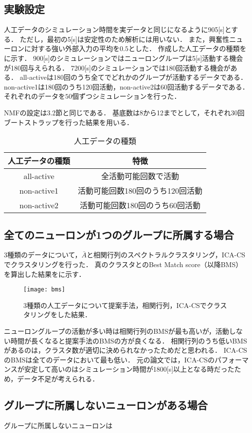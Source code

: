 \subsection{実験設定}
人工データのシミュレーション時間を実データと同じになるように905[s]とする．
ただし，最初の5[s]は安定性のため解析には用いない．
また，興奮性ニューロンに対する強い外部入力の平均を$0.5$とした．
作成した人工データの種類をに示す．
900[s]のシミュレーションではニューロングループは5[s]活動する機会が180回与えられる．
7200[s]のシミュレーションでは180回活動する機会がある．
all-activeは180回のうち全てでどれかのグループが活動するデータである．
non-active1は180回のうち120回活動，non-active2は60回活動するデータである．
それぞれのデータを$50$個ずつシミュレーションを行った．

NMFの設定は3.2節と同じである．
基底数は8から12までとして，それぞれ30回ブートストラップを行った結果を用いる．

\begin{table}[htb]
  \center
  \begin{tabular}{|c|c|} \hline
    人工データの種類 & 特徴 \\ \hline
		all-active & 全活動可能回数で活動 \\
		non-active1 & 活動可能回数180回のうち120回活動 \\
		non-active2 & 活動可能回数180回のうち60回活動 \\ \hline
  \end{tabular}
  \caption{人工データの種類}
  \label{tab:art_dat}
\end{table}

\subsection{全てのニューロンが1つのグループに所属する場合}
3種類のデータについて，$\bar{A}$と相関行列のスペクトラルクラスタリング，ICA-CSでクラスタリングを行った．
真のクラスタとのBest Match score（以降BMS）を算出した結果をに示す．
\begin{figure}[htbp]
    \begin{center}
        \texttt{[image: bms]}
        \caption{3種類の人工データについて提案手法，相関行列，ICA-CSでクラスタリングをした結果．}
        \label{fig:bms}
    \end{center}
\end{figure}
ニューロングループの活動が多い時は相関行列のBMSが最も高いが，活動しない時間が長くなると提案手法のBMSの方が良くなる．
相関行列のうち低いBMSがあるのは，クラスタ数が適切に決められなかったためだと思われる．
ICA-CSのBMSは全てのデータにおいて最も低い．
元の論文では，ICA-CSのパフォーマンスが安定して高いのはシミュレーション時間が1800[s]以上となる時だったため，データ不足が考えられる．

\subsection{グループに所属しないニューロンがある場合}
グループに所属しないニューロンは
